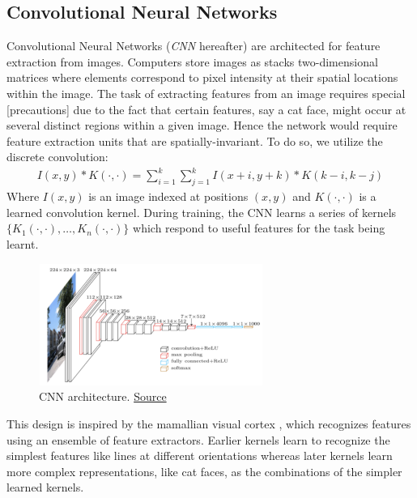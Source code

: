 \documentclass[paper=a4, fontsize=12pt]{scrartcl} %
\numberwithin{equation}{section} %
\numberwithin{figure}{section} %
\numberwithin{table}{section} %
\begin{document}
\pagebreak

\subsection{Convolutional Neural Networks}

Convolutional Neural Networks (\textit{CNN} hereafter) are architected for feature extraction from images. Computers store images as stacks
two-dimensional matrices where elements correspond to pixel intensity at their spatial locations within the image. The task of extracting features from 
an image requires special [precautions] due to the fact that certain features, say a cat face, might occur at several distinct regions within 
a given image. Hence the network would require feature extraction units that are spatially-invariant. To do so, we utilize the 
discrete convolution:
\begin{align*}
    I(x, y) * K(\cdot, \cdot) = \sum_{i = 1}^k \sum_{j = 1}^k I(x + i, y + k) * K(k - i, k - j)
\end{align*}
Where $I(x, y)$ is an image indexed at positions $(x, y)$ and $K(\cdot, \cdot)$ is a learned convolution kernel. During training, the CNN learns a series of 
kernels $\{ K_1(\cdot, \cdot), \ldots, K_n(\cdot, \cdot) \}$ which respond to useful features for the task being learnt.

\begin{figure}[H]
    \centering
    \includegraphics[width=0.65\textwidth]{images/cnn}
    \caption{CNN architecture. \href{https://medium.com/@purnasaigudikandula/a-beginner-intro-to-convolutional-neural-networks-684c5620c2ce}{Source}}
\end{figure}

This design is inspired by the mamallian visual cortex \cite{cortex}, which recognizes features using an ensemble of feature extractors. Earlier kernels learn to recognize 
the simplest features like lines at different orientations whereas later kernels learn more complex representations, like cat faces, as the combinations of the simpler learned kernels.
\end{document}
